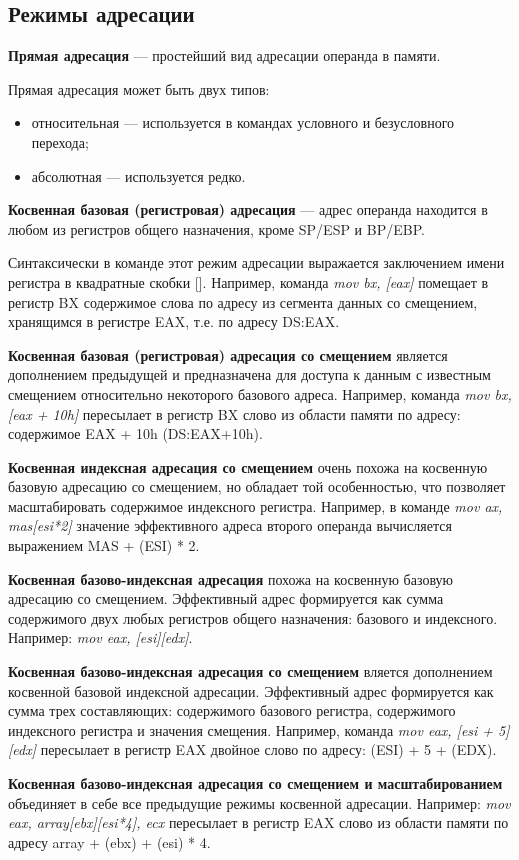 \subsection{Режимы адресации}

\textbf{Прямая адресация} --- простейший вид адресации операнда в памяти.

Прямая адресация может быть двух типов:
\begin{itemize}
\item относительная --- используется в командах условного и безусловного перехода;
\item абсолютная --- используется редко.
\end{itemize}

\textbf{Косвенная базовая (регистровая) адресация} --- адрес операнда находится в любом из
регистров общего назначения, кроме SP/ESP и BP/EBP.

Синтаксически в команде этот режим адресации выражается заключением имени регистра в квадратные скобки [].
Например, команда \textit{mov bx, [eax]}
помещает в регистр BX содержимое слова по адресу из сегмента данных со смещением,
хранящимся в регистре EAX, т.е. по адресу DS:EAX.

\textbf{Косвенная базовая (регистровая) адресация со смещением} является дополнением
предыдущей и предназначена для доступа к данным с известным смещением относительно
некоторого базового адреса. Например, команда
\textit{mov bx, [eax + 10h]}
пересылает в регистр BX слово из области памяти по адресу:
содержимое EAX + 10h (DS:EAX+10h).

\textbf{Косвенная индексная адресация со смещением} очень похожа на косвенную базовую
адресацию со смещением, но обладает той особенностью, что позволяет масштабировать
содержимое индексного регистра. Например, в команде
\textit{mov ax, mas[esi*2]}
значение эффективного адреса второго операнда вычисляется выражением MAS + (ESI) * 2.

\textbf{Косвенная базово-индексная адресация} похожа на косвенную базовую адресацию со
смещением. Эффективный адрес формируется как сумма содержимого двух любых регистров
общего назначения: базового и индексного. Например: \textit{mov eax, [esi][edx]}.

\textbf{Косвенная базово-индексная адресация со смещением} вляется дополнением косвенной
базовой индексной адресации. Эффективный адрес формируется как сумма трех составляющих:
содержимого базового регистра, содержимого индексного регистра и значения смещения.
Например, команда \textit{mov eax, [esi + 5][edx]} 
пересылает в регистр EAX двойное слово по адресу: (ESI) + 5 + (EDX).

\textbf{Косвенная базово-индексная адресация со смещением и масштабированием}
объединяет в себе все предыдущие режимы косвенной адресации. Например:
\textit{mov eax, array[ebx][esi*4], ecx}
пересылает в регистр EAX слово из области памяти по адресу array + (ebx) + (esi) * 4.